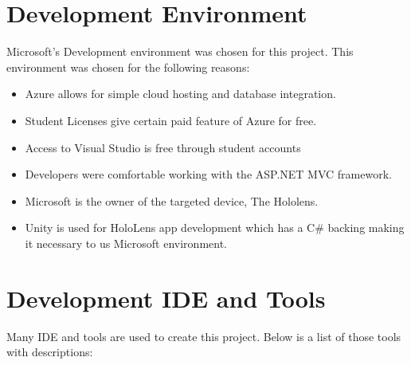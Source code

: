 \section{Development Environment}
Microsoft's Development environment was chosen for this project. This environment
was chosen for the following reasons:

\begin{itemize}
    \item Azure allows for simple cloud hosting and database integration.

    \item Student Licenses give certain paid feature of Azure for free.
    
    \item Access to Visual Studio is free through student accounts

    \item Developers were comfortable working with the ASP.NET MVC framework.

    \item Microsoft is the owner of the targeted device, The Hololens.

    \item Unity is used for HoloLens app development which has a C\# backing making it necessary to us Microsoft environment.

\end{itemize}

\section{Development IDE and Tools}
Many IDE and tools are used to create this project. Below is a list of those
tools with descriptions:

